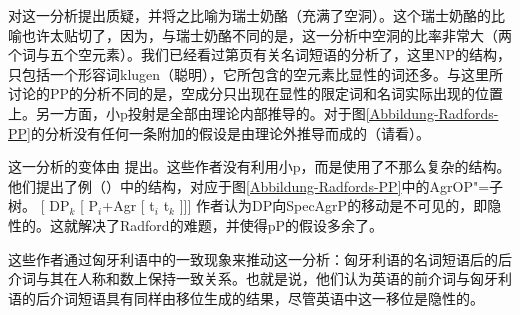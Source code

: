  \citet[--550]{Sternefeld2006a-u}对这一分析提出质疑，并将之比喻为瑞士奶酪（充满了空洞）。这个瑞士奶酪的比喻也许太贴切了，因为，与瑞士奶酪不同的是，这一分析中空洞的比率非常大（两个词与五个空元素）。我们已经看过第\pageref{Abbildung-NP-ohne-Det}页有关名词短语的分析了，这里NP的结构，只包括一个形容词klugen（聪明），它所包含的空元素比显性的词还多。与这里所讨论的PP的分析不同的是，空成分只出现在显性的限定词和名词实际出现的位置上。另一方面，小p投射是全部由理论内部推导的。对于图\ref{Abbildung-Radfords-PP}的分析没有任何一条附加的假设是由理论外推导而成的（请看\citealp[--550]{Sternefeld2006a-u}）。

这一分析的变体由 \citet*[]{HNG2005a}提出。这些作者没有利用小p，而是使用了不那么复杂的结构。他们提出了例（）中的结构，对应于图\ref{Abbildung-Radfords-PP}中的AgrOP"=子树。
\ea
{}[ DP$_k$ [ P$_i$+Agr [ t$_i$ t$_k$ ]]]
\z
作者认为DP向SpecAgrP的移动是不可见的，即隐性的。这就解决了Radford的难题，并使得pP的假设多余了。

这些作者通过匈牙利语中的一致现象来推动这一分析：匈牙利语的名词短语后的后介词与其在人称和数上保持一致关系。也就是说，他们认为英语的前介词与匈牙利语的后介词短语具有同样由移位生成的结果，尽管英语中这一移位是隐性的。

